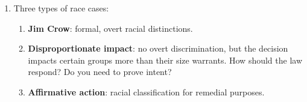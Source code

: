 % 
% 
% 
% 
% 
% 
% 
% 
% 
% 
% 

\begin{enumerate}
    \item Three types of race cases:
    \begin{enumerate}
        \item \textbf{Jim Crow}: formal, overt racial distinctions.
        \item \textbf{Disproportionate impact}: no overt discrimination, but 
        the decision impacts certain groups more than their size warrants. How 
        should the law respond? Do you need to prove intent?
        \item \textbf{Affirmative action}: racial classification for remedial 
        purposes.
    \end{enumerate}
\end{enumerate}

